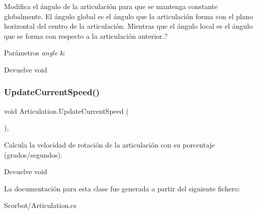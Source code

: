 Modifica el ángulo de la articulación para que se mantenga constante globalmente. El ángulo global es el ángulo que la articulación forma con el plano horizontal del centro de la articulación. Mientras que el ángulo local es el ángulo que se forma con respecto a la articulación anterior.? 
\begin{DoxyParams}{Parámetros}
{\em angle} & \\
\hline
\end{DoxyParams}
\begin{DoxyReturn}{Devuelve}
void 
\end{DoxyReturn}
\mbox{\label{class_articulation_a88aec688de1ef2c8b019709865be4383}} 
\subsubsection{\texorpdfstring{UpdateCurrentSpeed()}{UpdateCurrentSpeed()}}
{\footnotesize\ttfamily void Articulation.\+Update\+Current\+Speed (\begin{DoxyParamCaption}{ }\end{DoxyParamCaption})\hspace{0.3cm}{\ttfamily [inline]}, {\ttfamily [private]}}

Calcula la velocidad de rotación de la articulación con su porcentaje (grados/segundos). \begin{DoxyReturn}{Devuelve}
void 
\end{DoxyReturn}


La documentación para esta clase fue generada a partir del siguiente fichero\+:\begin{DoxyCompactItemize}
\item 
Scorbot/Articulation.\+cs\end{DoxyCompactItemize}

